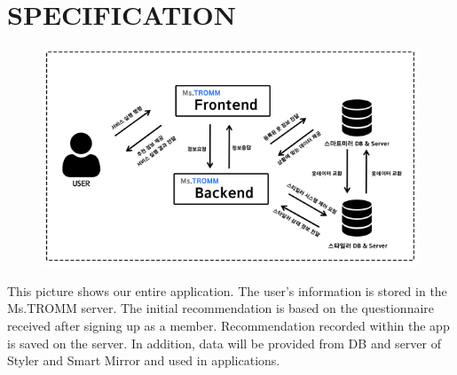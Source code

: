 \documentclass[conference]{IEEEtran}
\begin{document}
\section{SPECIFICATION}
    \begin{figure}[htbp]
\centerline{\includegraphics[scale=0.35]{0. Ms.TROMM Diagram.png}}
\label{fig}
\end{figure}
This picture shows our entire application. The user's information is stored in the Ms.TROMM server. The initial recommendation is based on the questionnaire received after signing up as a member. Recommendation recorded within the app is saved on the server. In addition, data will be provided from DB and server of Styler and Smart Mirror and used in applications. \\ \\ \\ \\ \\ \\ \\ \\ \\ \\
\end{document}
